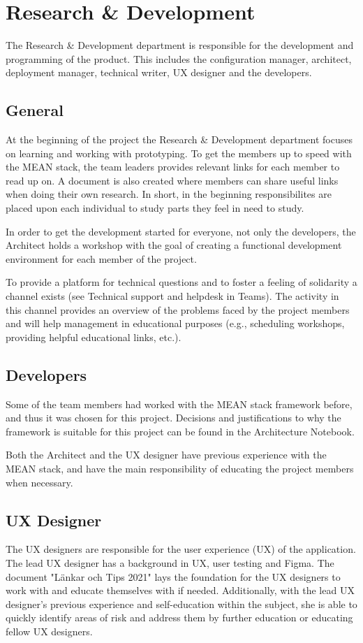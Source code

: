 \section{Research \& Development}
\label{sec:r&d}
The Research \& Development department is responsible for the development and programming of the product. This includes the configuration manager, architect, deployment manager, technical writer, UX designer and the developers. 

\subsection{General}
\label{sec:r&d:randgeneral}
At the beginning of the project the Research \& Development department focuses on learning and working with prototyping. To get the members up to speed with the MEAN stack, the team leaders provides relevant links for each member to read up on. A document is also created where members can share useful links when doing their own research. In short, in the beginning responsibilites are placed upon each individual to study parts they feel in need to study.

In order to get the development started for everyone, not only the developers, the Architect holds a workshop with the goal of creating a functional development environment for each member of the project. 

To provide a platform for technical questions and to foster a feeling of solidarity a channel exists (see Technical support and helpdesk in Teams). The activity in this channel provides an overview of the problems faced by the project members and will help management in educational purposes (e.g., scheduling workshops, providing helpful educational links, etc.).

\subsection{Developers}
\label{sec:r&d:developers}
Some of the team members had worked with the MEAN stack framework before, and thus it was chosen for this project. Decisions and justifications to why the framework is suitable for this project can be found in the Architecture Notebook.

Both the Architect and the UX designer have previous experience with the MEAN stack, and have the main responsibility of educating the project members when necessary. 


\subsection{UX Designer}
\label{sec:r&d:ux}
The UX designers are responsible for the user experience (UX) of the application. The lead UX designer has a background in UX, user testing and Figma. The document "Länkar och Tips 2021" lays the foundation for the UX designers to work with and educate themselves with if needed. Additionally, with the lead UX designer's previous experience and self-education within the subject, she is able to quickly identify areas of risk and address them by further education or educating fellow UX designers. 

